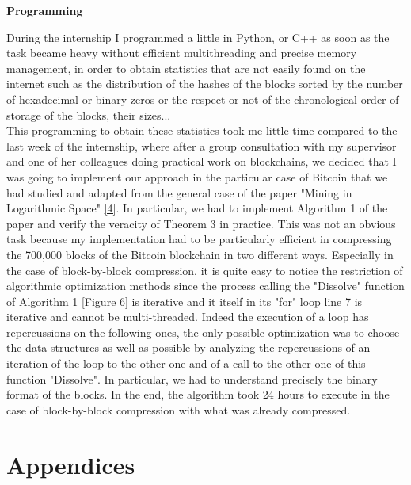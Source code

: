 \documentclass[12pt,a4paper]{article}
\newcommand{\source}[1]{\hyperlink{#1}{[#1]}}
\newcommand{\annexe}[2]{\hyperlink{#1}{[Figure #2]}}
\begin{document}
	\textbf{Programming\\}
	
	During the internship I programmed a little in Python, or C++ as soon as the task became heavy without efficient multithreading and precise memory management, in order to obtain statistics that are not easily found on the internet such as the distribution of the hashes of the blocks sorted by the number of hexadecimal or binary zeros or the respect or not of the chronological order of storage of the blocks, their sizes...\\
	This programming to obtain these statistics took me little time compared to the last week of the internship, where after a group consultation with my supervisor and one of her colleagues doing practical work on blockchains, we decided that I was going to implement our approach in the particular case of Bitcoin that we had studied and adapted from the general case of the paper "Mining in Logarithmic Space" \source{4}. In particular, we had to implement Algorithm 1 of the paper and verify the veracity of Theorem 3 in practice. This was not an obvious task because my implementation had to be particularly efficient in compressing the 700,000 blocks of the Bitcoin blockchain in two different ways. Especially in the case of block-by-block compression, it is quite easy to notice the restriction of algorithmic optimization methods since the process calling the "Dissolve" function of Algorithm 1 \annexe{26}{6} is iterative and it itself in its "for" loop line 7 is iterative and cannot be multi-threaded. Indeed the execution of a loop has repercussions on the following ones, the only possible optimization was to choose the data structures as well as possible by analyzing the repercussions of an iteration of the loop to the other one and of a call to the other one of this function "Dissolve". In particular, we had to understand precisely the binary format of the blocks. In the end, the algorithm took 24 hours to execute in the case of block-by-block compression with what was already compressed.
	
	\newpage
	
	\section{Appendices}
	
\end{document}
